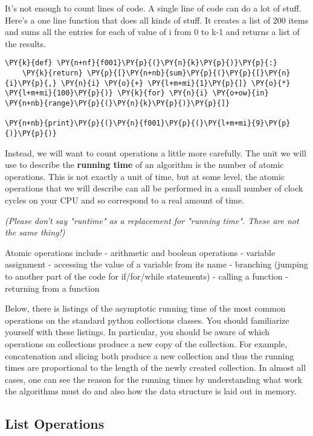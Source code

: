 It's not enough to count lines of code.
A single line of code can do a lot of stuff.
Here's a one line function that does all kinds of stuff.
It creates a list of 200 items and sums all the entries for each of value of i from 0 to k-1 and returns a list of the results.

\begin{Verbatim}[commandchars=\\\{\}]
\PY{k}{def} \PY{n+nf}{f001}\PY{p}{(}\PY{n}{k}\PY{p}{)}\PY{p}{:}
    \PY{k}{return} \PY{p}{[}\PY{n+nb}{sum}\PY{p}{(}\PY{p}{[}\PY{n}{i}\PY{p}{,} \PY{n}{i} \PY{o}{+} \PY{l+m+mi}{1}\PY{p}{]} \PY{o}{*} \PY{l+m+mi}{100}\PY{p}{)} \PY{k}{for} \PY{n}{i} \PY{o+ow}{in} \PY{n+nb}{range}\PY{p}{(}\PY{n}{k}\PY{p}{)}\PY{p}{]}

\PY{n+nb}{print}\PY{p}{(}\PY{n}{f001}\PY{p}{(}\PY{l+m+mi}{9}\PY{p}{)}\PY{p}{)}
\end{Verbatim}



Instead, we will want to count operations a little more carefully.
The unit we will use to describe the \textbf{running time} of an algorithm is the number of atomic operations.
This is not exactly a unit of time, but at some level, the atomic operations that we will describe can all be performed in a small number of clock cycles on your CPU and so correspond to a real amount of time.


\emph{(Please don't say "runtime" as a replacement for "running time".  These are not the same thing!)}


Atomic operations include
 - arithmetic and boolean operations
 - variable assignment
 - accessing the value of a variable from its name
 - branching (jumping to another part of the code for if/for/while statements)
 - calling a function
 - returning from a function


Below, there is listings of the asymptotic running time of the most common operations on the standard python collections classes.
You should familiarize yourself with these listings.
In particular, you should be aware of which operations on collections produce a new copy of the collection.
For example, concatenation and slicing both produce a new collection and thus the running times are proportional to the length of the newly created collection.
In almost all cases, one can see the reason for the running times by understanding what work the algorithms must do and also how the data structure is laid out in memory.

\subsection{List Operations}

